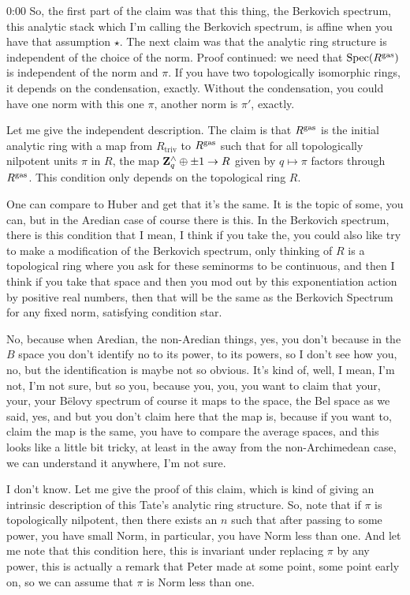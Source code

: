 \begin{unfinished}{0:00}
So, the first part of the claim was that this thing, the Berkovich spectrum, this analytic stack which I'm calling the Berkovich spectrum, is affine when you have that assumption $\star$. The next claim was that the analytic ring structure is independent of the choice of the norm. Proof continued: we need that $\operatorname{Spec}(R^{\mathrm{gas}})$ is independent of the norm and $\pi$. If you have two topologically isomorphic rings, it depends on the condensation, exactly. Without the condensation, you could have one norm with this one $\pi$, another norm is $\pi'$, exactly.

Let me give the independent description. The claim is that $R^{\mathrm{gas}}$ is the initial analytic ring with a map from $R_{\text{triv}}$ to $R^{\mathrm{gas}}$ such that for all topologically nilpotent units $\pi$ in $R$, the map $\mathbf Z_q^\wedge \oplus \pm 1 \to R$ given by $q \mapsto \pi$ factors through $R^{\mathrm{gas}}$. This condition only depends on the topological ring $R$.

One can compare to Huber and get that it's the same. It is the topic of some, you can, but in the Aredian case of course there is this. In the Berkovich spectrum, there is this condition that I mean, I think if you take the, you could also like try to make a modification of the Berkovich spectrum, only thinking of $R$ is a topological ring where you ask for these seminorms to be continuous, and then I think if you take that space and then you mod out by this exponentiation action by positive real numbers, then that will be the same as the Berkovich Spectrum for any fixed norm, satisfying condition star.

No, because when Aredian, the non-Aredian things, yes, you don't because in the $B$ space you don't identify no to its power, to its powers, so I don't see how you, no, but the identification is maybe not so obvious. It's kind of, well, I mean, I'm not, I'm not sure, but so you, because you, you, you want to claim that your, your, your Bëlovy spectrum of course it maps to the space, the Bel space as we said, yes, and but you don't claim here that the map is, because if you want to, claim the map is the same, you have to compare the average spaces, and this looks like a little bit tricky, at least in the away from the non-Archimedean case, we can understand it anywhere, I'm not sure.

I don't know. Let me give the proof of this claim, which is kind of giving an intrinsic description of this Tate's analytic ring structure. So, note that if $\pi$ is topologically nilpotent, then there exists an $n$ such that after passing to some power, you have small Norm, in particular, you have Norm less than one. And let me note that this condition here, this is invariant under replacing $\pi$ by any power, this is actually a remark that Peter made at some point, some point early on, so we can assume that $\pi$ is Norm less than one.


\end{unfinished}
